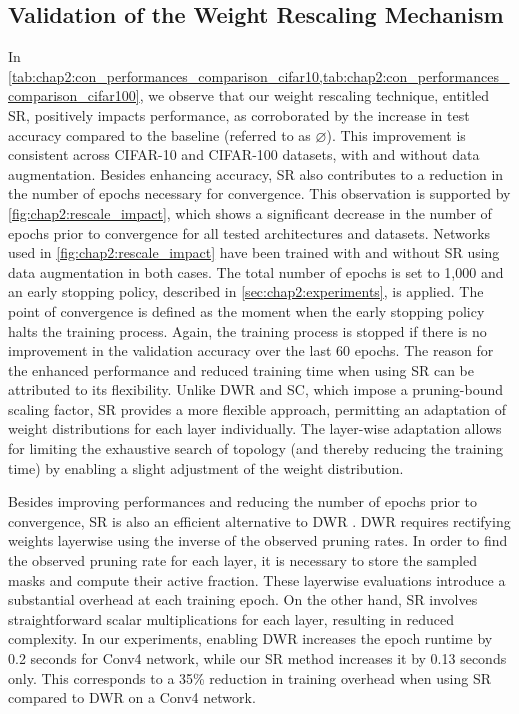 \subsection{Validation of the Weight Rescaling Mechanism}
\label{sec:chap2:validation_weight_rescaling}
In
\cref{tab:chap2:con_performances_comparison_cifar10,tab:chap2:con_performances_comparison_cifar100},
we observe that our weight rescaling technique, entitled \acf{SR}, positively
impacts performance, as corroborated by the increase in test accuracy compared
to the baseline (referred to as $\varnothing$). This improvement is consistent
across CIFAR-10 and CIFAR-100 datasets, with and without data augmentation.
Besides enhancing accuracy, \ac{SR} also contributes to a reduction in the
number of epochs necessary for convergence. This observation is supported by
\cref{fig:chap2:rescale_impact}, which shows a significant decrease in the
number of epochs prior to convergence for all tested architectures and datasets.
Networks used in \cref{fig:chap2:rescale_impact} have been trained with and
without \ac{SR} using data augmentation in both cases. The total number of
epochs is set to 1,000 and an early stopping policy, described in
\cref{sec:chap2:experiments}, is applied. The point of convergence is defined as
the moment when the early stopping policy halts the training process. Again, the
training process is stopped if there is no improvement in the validation
accuracy over the last 60 epochs. The reason for the enhanced performance and
reduced training time when using \ac{SR} can be attributed to its flexibility.
Unlike \ac{DWR} and \ac{SC}, which impose a pruning-bound scaling factor,
\ac{SR} provides a more flexible approach, permitting an adaptation of weight
distributions for each layer individually. The layer-wise adaptation allows for
limiting the exhaustive search of topology (and thereby reducing the training
time) by enabling a slight adjustment of the weight distribution.

Besides improving performances and reducing the number of epochs prior to
convergence, \ac{SR} is also an efficient alternative to \acf{DWR}
\cite{DBLP:conf/nips/ZhouLLY19}. \ac{DWR} requires rectifying weights layerwise
using the inverse of the observed pruning rates. In order to find the observed
pruning rate for each layer, it is necessary to store the sampled masks and
compute their active fraction. These layerwise evaluations introduce a
substantial overhead at each training epoch. On the other hand, \ac{SR} involves
straightforward scalar multiplications for each layer, resulting in reduced
complexity. In our experiments, enabling \ac{DWR} increases the epoch runtime by
0.2 seconds for Conv4 network, while our \ac{SR} method increases it by 0.13
seconds only. This corresponds to a 35\% reduction in training overhead when
using \ac{SR} compared to \ac{DWR} on a Conv4 network.\\

